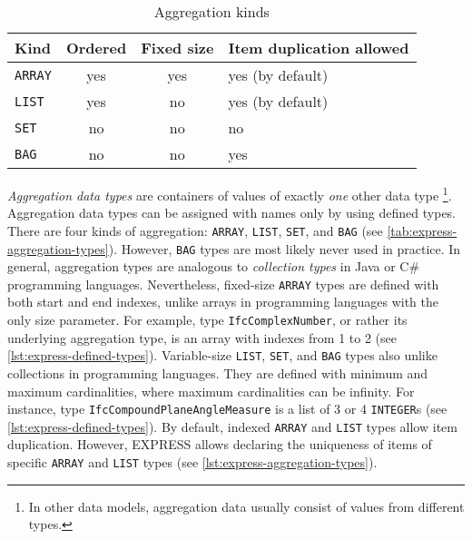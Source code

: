 \begin{table}\footnotesize
    \centering
    \caption{Aggregation kinds}
    \label{tab:express-aggregation-types}
    
    
    \begin{tabu} to \columnwidth { l c c X[c] }
        \hline
            Kind     &   Ordered & Fixed size    & Item duplication allowed  \\
        \hline
            \texttt{ARRAY}  &   yes     & yes           & yes (by default)          \\
            \texttt{LIST}   &   yes     & no            & yes (by default)          \\
            \texttt{SET}    &   no      & no            & no                        \\
            \texttt{BAG}    &   no      & no            & yes                       \\
        \hline
    \end{tabu}
\end{table}



\emph{Aggregation data types} are containers of values of exactly \emph{one} other data type
\footnote{In other data models, aggregation data usually consist of values from different types.}.
Aggregation data types can be assigned with names only by using defined types.
There are four kinds of aggregation: \texttt{ARRAY}, \texttt{LIST}, \texttt{SET}, and \texttt{BAG} (see \autoref{tab:express-aggregation-types}).
However, \texttt{BAG} types are most likely never used in practice.
In general, aggregation types are analogous to \emph{collection types} in Java or C{\#} programming languages.
Nevertheless, fixed-size \texttt{ARRAY} types are defined with both start and end indexes, unlike arrays in programming languages with the only size parameter.
For example, type \texttt{IfcComplexNumber}, or rather its underlying aggregation type, is an array with indexes from 1 to 2 (see \autoref{lst:express-defined-types}).
Variable-size \texttt{LIST}, \texttt{SET}, and \texttt{BAG} types also unlike collections in programming languages.
They are defined with minimum and maximum cardinalities, where maximum cardinalities can be infinity.
For instance, type \texttt{IfcCompoundPlaneAngleMeasure} is a list of 3 or 4 \texttt{INTEGER}s (see \autoref{lst:express-defined-types}).
By default, indexed \texttt{ARRAY} and \texttt{LIST} types allow item duplication.
However, EXPRESS allows declaring the uniqueness of items of specific \texttt{ARRAY} and \texttt{LIST} types (see \autoref{lst:express-aggregation-types}).


